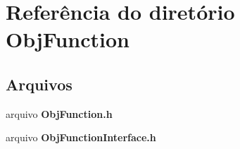 \section{Referência do diretório Obj\+Function}
\label{dir_e15a250ecfbdd1078a33f51701bc186a}
\subsection*{Arquivos}
\begin{DoxyCompactItemize}
\item 
arquivo {\bf Obj\+Function.\+h}
\item 
arquivo {\bf Obj\+Function\+Interface.\+h}
\end{DoxyCompactItemize}

